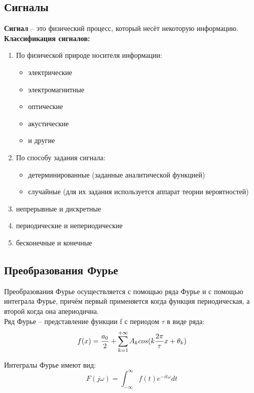 \documentclass[a4paper,14pt]{extarticle}
\begin{document}
\subsection{Сигналы}

\textbf{Сигнал} -- это физический процесс, который несёт некоторую информацию.\\

\textbf{Классификация сигналов:}
\begin{enumerate}
\item По физической природе носителя информации:
	\begin{itemize}
	\item электрические
	\item электромагнитные
	\item оптические
	\item акустические
	\item и другие
	\end{itemize}
\item По способу задания сигнала:
	\begin{itemize}
	\item детерминированные (заданные аналитической функцией)
	\item случайные (для их задания используется аппарат теории вероятностей)
	\end{itemize}
\item непрерывные и дискретные 
\item периодические и непериодические
\item бесконечные и конечные
\end{enumerate}

\subsection{Преобразования Фурье}

Преобразования Фурье осуществляется с помощью ряда Фурье и с помощью интеграла Фурье, причём первый применяется когда функция периодическая, а второй когда она апериодична.\\

Ряд Фурье -- представление функции f с периодом $\tau$ в виде ряда:
\begin{equation}
f(x) = {a_0\over 2} + \sum_{k=1}^{+\infty}A_k cos(k{2\pi\over \tau}x + \theta_k)
\end{equation}

Интегралы Фурье имеют вид:
\begin{equation}
F(j\omega) = \int_{-\infty}^{\infty} f(t) e^{-it\omega} dt
\end{equation}
\end{document}
